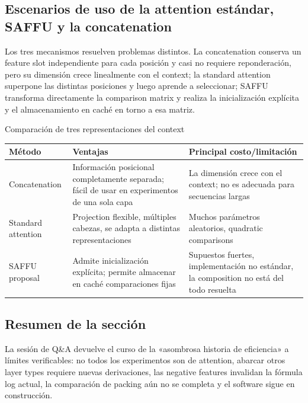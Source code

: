
\subsection{Escenarios de uso de la attention estándar, SAFFU y la concatenation}

Los tres mecanismos resuelven problemas distintos. La concatenation conserva un feature slot independiente para cada posición y casi no requiere reponderación, pero su dimensión crece linealmente con el context; la standard attention superpone las distintas posiciones y luego aprende a seleccionar; SAFFU transforma directamente la comparison matrix y realiza la inicialización explícita y el almacenamiento en caché en torno a esa matriz.

\begin{knowledgebox}{Comparación de tres representaciones del context}
\begin{tabularx}{\textwidth}{L{0.19\textwidth} L{0.25\textwidth} X}
\toprule
Método & Ventajas & Principal costo/limitación \\
\midrule
Concatenation & Información posicional completamente separada; fácil de usar en experimentos de una sola capa & La dimensión crece con el context; no es adecuada para secuencias largas \\
Standard attention & Projection flexible, múltiples cabezas, se adapta a distintas representaciones & Muchos parámetros aleatorios, quadratic comparisons \\
SAFFU proposal & Admite inicialización explícita; permite almacenar en caché comparaciones fijas & Supuestos fuertes, implementación no estándar, la composition no está del todo resuelta \\
\bottomrule
\end{tabularx}
\end{knowledgebox}

\subsection{Resumen de la sección}

La sesión de Q\&A devuelve el curso de la «asombrosa historia de eficiencia» a límites verificables: no todos los experimentos son de attention, abarcar otros layer types requiere nuevas derivaciones, las negative features invalidan la fórmula log actual, la comparación de packing aún no se completa y el software sigue en construcción.
